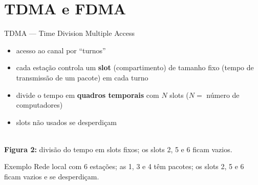 \documentclass[aspectratio=169,11pt]{beamer}
\begin{document}
\section{TDMA e FDMA}

\begin{frame}{TDMA --- Time Division Multiple Access}
  \begin{itemize}
    \item acesso ao canal por ``turnos''
    \item cada estação controla um \textbf{slot} (compartimento) de tamanho fixo (tempo de transmissão de um pacote) em cada turno
    \item divide o tempo em \textbf{quadros temporais} com $N$ slots ($N=$ número de computadores)
    \item \alert{slots não usados se desperdiçam}
  \end{itemize}
  \begin{center}
    \\[1mm]
    {\scriptsize \textbf{Figura 2:} divisão do tempo em slots fixos; os slots 2, 5 e 6 ficam vazios.}
  \end{center}
  \begin{exampleblock}{Exemplo}
    Rede local com 6 estações; as 1, 3 e 4 têm pacotes; os slots 2, 5 e 6 ficam vazios e se desperdiçam.
  \end{exampleblock}
\end{frame}
\end{document}
